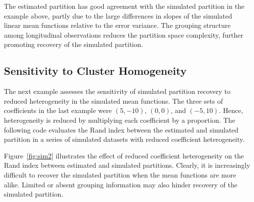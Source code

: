 \documentclass[article, nojss]{jss}
\begin{document}
The estimated partition has good agreement with the simulated partition in the example above, partly due to the large differences in slopes of the simulated linear mean functions relative to the error variance. The grouping structure among longitudinal observations reduces the partition space complexity, further promoting recovery of the simulated partition. 

\subsection[Sensitivity]{Sensitivity to Cluster Homogeneity}

The next example assesses the sensitivity of simulated partition recovery to reduced heterogeneity in the simulated mean functions. The three sets of coefficients in the last example were $(5,-10)$, $(0, 0)$, and $(-5, 10)$. Hence, heterogeneity is reduced by multiplying each coefficient by a proportion. The following  code evaluates the Rand index between the estimated and simulated partition in a series of simulated datasets with reduced coefficient heterogeneity.

\begin{Schunk}
\end{Schunk}

Figure~\ref{fig:sim2} illustrates the effect of reduced coefficient heterogeneity on the Rand index between estimated and simulated partitions. Clearly, it is increasingly difficult to recover the simulated partition when the mean functions are more alike. Limited or absent grouping information may also hinder recovery of the simulated partition. 
\end{document}
